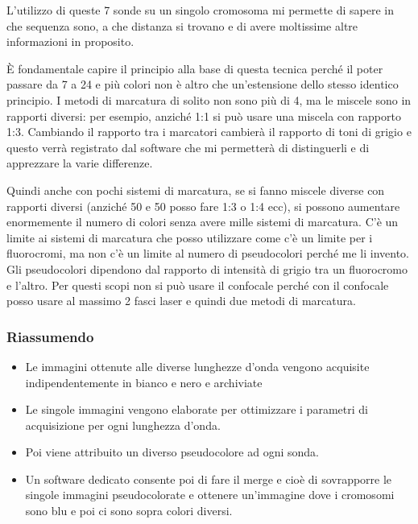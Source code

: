 \documentclass[11pt]{book}
\begin{document}
L'utilizzo di queste 7 sonde su un singolo cromosoma mi permette di sapere in che sequenza sono, a che distanza si trovano e di avere moltissime altre informazioni in proposito.

È fondamentale capire il principio alla base di questa tecnica perché il poter passare da 7 a 24 e più colori non è altro che un’estensione dello stesso identico principio. I metodi di marcatura di solito non sono più di 4, ma le miscele sono in rapporti diversi: per esempio, anziché 1:1 si può usare una miscela con rapporto 1:3. Cambiando il rapporto tra i marcatori cambierà il rapporto di toni di grigio e questo verrà registrato dal software che mi permetterà di distinguerli e di apprezzare la varie differenze.

Quindi anche con pochi sistemi di marcatura, se si fanno miscele diverse con rapporti diversi (anziché 50 e 50 posso fare 1:3 o 1:4 ecc), si possono aumentare enormemente il numero di colori senza avere mille sistemi di marcatura. C’è un limite ai sistemi di marcatura che posso utilizzare come c’è un limite per i fluorocromi, ma non c’è un limite al numero di pseudocolori perché me li invento. Gli pseudocolori dipendono dal rapporto di intensità di grigio tra un fluorocromo e l’altro.
Per questi scopi non si può usare il confocale perché con il confocale posso usare al massimo 2 fasci laser e quindi due metodi di marcatura.

\subsubsection{Riassumendo}
\begin{itemize}
\item Le immagini ottenute alle diverse lunghezze d’onda vengono acquisite indipendentemente in bianco e nero e archiviate
\item Le singole immagini vengono elaborate per ottimizzare i parametri di acquisizione per ogni lunghezza d’onda.
\item Poi viene attribuito un diverso pseudocolore ad ogni sonda.
\item Un software dedicato consente poi di fare il merge e cioè di sovrapporre le singole immagini pseudocolorate e ottenere un’immagine dove i cromosomi sono blu e poi ci sono sopra colori diversi.
\end{itemize}
\end{document}
